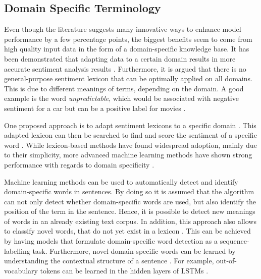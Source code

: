 \documentclass[11pt, a4paper]{article}
\begin{document}
\subsection{Domain Specific Terminology}
Even though the literature suggests many 
innovative ways to enhance model performance by a few percentage points, the biggest benefits seem to come from high quality 
input data in the form of a domain-specific knowledge base. It has been demonstrated that adapting data to a certain domain
results in more accurate sentiment analysis results \citep{park2015EfficientExtraction}.
Furthermore, it is argued that there is no general-purpose sentiment lexicon that can be optimally applied on all domains. 
This is due to different meanings of terms, depending on the domain. A good example is the word \emph{unpredictable}, 
which would be associated with negative sentiment for a car but can be a positive label for movies \citep{bo2008opinionmining}.

One proposed approach is to adapt sentiment lexicons to a specific domain \citep{Lu2011automaticconstruction}. This adapted lexicon can then be searched to find and score the sentiment 
of a specific word \citep{ashgar2014DetectionSlang}. 
While lexicon-based methods have found widespread adoption, mainly due to their simplicity, more advanced machine 
learning methods have shown strong performance with regards to domain specificity \citep{wang2020automaticconstructiondomainsentiment}. %

Machine learning methods can be used to automatically detect and identify domain-specific words in sentences. By doing so it is assumed that the 
algorithm can not only detect whether domain-specific words are used, but also identify 
the position of the term in the sentence. Hence, it is possible to detect new meanings 
of words in an already existing text corpus. In addition, this approach also allows to classify novel words, that do not yet 
exist in a lexicon \citep{pei2019slang}. This can be achieved by having models that formulate domain-specific word detection as a 
sequence-labelling task. Furthermore, novel domain-specific words can be learned by understanding the contextual 
structure of a sentence \citep{pei2019slang}. For example, out-of-vocabulary tokens can be learned in the hidden layers of 
LSTMs \citep{hochreiter1997lstm}.
\end{document}
